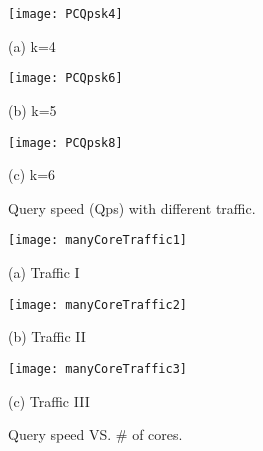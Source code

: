 \begin{figure*}[htbp]
\begin{minipage}{0.32\linewidth}
  \centerline{\texttt{[image: PCQpsk4]}}
  \centerline{(a) k=4}
\end{minipage}
\hfill
\begin{minipage}{0.32\linewidth}
  \centerline{\texttt{[image: PCQpsk6]}}
  \centerline{(b) k=5}
\end{minipage}
\hfill
\begin{minipage}{0.32\linewidth}
  \centerline{\texttt{[image: PCQpsk8]}}
  \centerline{(c) k=6}
\end{minipage}
\caption{Query speed (Qps) with different traffic.}
\label{fig:PC:QPS}
\end{figure*}





\begin{figure*}[htbp]
\begin{minipage}{0.32\linewidth}
  \centerline{\texttt{[image: manyCoreTraffic1]}}
  \centerline{(a) Traffic I}
\end{minipage}
\hfill
\begin{minipage}{0.32\linewidth}
  \centerline{\texttt{[image: manyCoreTraffic2]}}
  \centerline{(b) Traffic II}
\end{minipage}
\hfill
\begin{minipage}{0.32\linewidth}
  \centerline{\texttt{[image: manyCoreTraffic3]}}
  \centerline{(c) Traffic III}
\end{minipage}
\caption{Query speed VS. \# of cores.}
\label{fig:manycore:QPS}
\end{figure*}




